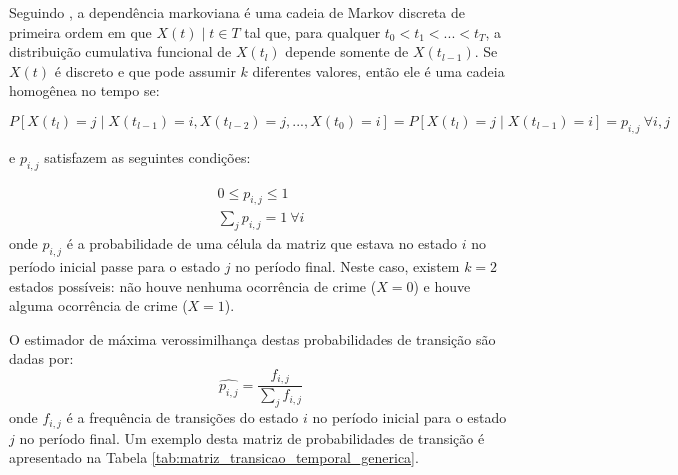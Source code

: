 \documentclass[12pt,openright,oneside,a4paper,english,french,spanish]{abntex2}
\numberwithin{table}{section} %
\numberwithin{figure}{section} %
\newcommand{\co}{\citeonline}
\begin{document}
Seguindo \co{rey2012exploratory}, a dependência markoviana é uma cadeia de Markov discreta de primeira ordem em que $X(t) \mid t \in T$ tal que, para qualquer $t_0 < t_1 < ... < t_T$, a distribuição cumulativa funcional de $X(t_l)$ depende somente de $X(t_{l-1})$. Se $X(t)$ é discreto e que pode assumir $k$ diferentes valores, então ele é uma cadeia homogênea no tempo se:
\begin{small}
\begin{equation}
P[ X(t_l)=j \mid  X(t_{l-1})=i, X(t_{l-2})=j,...,X(t_{0})=i]=P[ X(t_l)=j \mid  X(t_{l-1})=i]=p_{i,j} \ \forall i,j
\label{eq:prob_cond_time_invariant}
\end{equation}
\end{small}
e $p_{i,j}$ satisfazem as seguintes condições:

\begin{align*}
0 \leq p_{i,j} \leq 1 \\
\sum _jp_{i,j}=1 \ \forall i
\end{align*}
onde $p_{i,j}$ é a probabilidade de uma célula da matriz que estava no estado $i$ no período inicial passe para o estado $j$ no período final. Neste caso, existem $k=2$ estados possíveis: não houve nenhuma ocorrência de crime ($X = 0$) e houve alguma ocorrência de crime ($X = 1$).

O estimador de máxima verossimilhança destas probabilidades de transição são dadas por:
\begin{equation}
\widehat{p_{i,j}}=\frac{f_{i,j}}{\sum _jf_{i,j}}
\end{equation}
onde $f_{i,j}$ é a frequência de transições do estado $i$ no período inicial para o estado $j$ no período final. Um exemplo desta matriz de probabilidades de transição é apresentado na Tabela \ref{tab:matriz_transicao_temporal_generica}.

\end{document}

